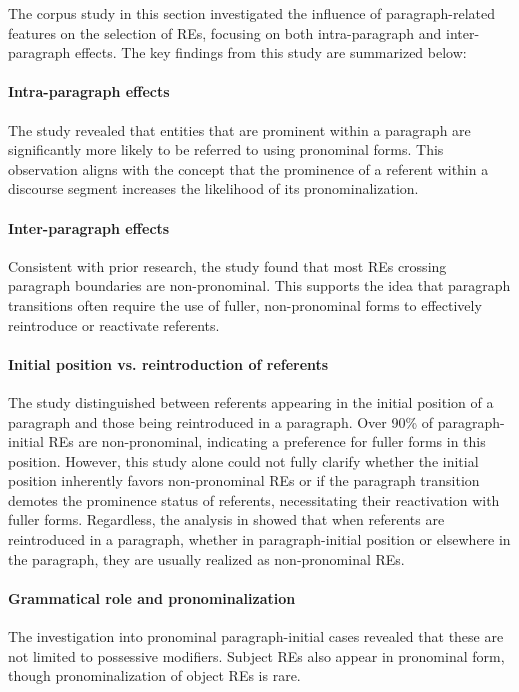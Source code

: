 The corpus study in this section investigated the influence of paragraph-related features on the selection of REs, focusing on both intra-paragraph and inter-paragraph effects. The key findings from this study are summarized below:

\paragraph*{Intra-paragraph effects} The study revealed that entities that are prominent within a paragraph are significantly more likely to be referred to using pronominal forms. This observation aligns with the concept that the prominence of a referent within a discourse segment increases the likelihood of its pronominalization.

\paragraph*{Inter-paragraph effects} Consistent with prior research, the study found that most REs crossing paragraph boundaries are non-pronominal. This supports the idea that paragraph transitions often require the use of fuller, non-pronominal forms to effectively reintroduce or reactivate referents.

\paragraph*{Initial position vs. reintroduction of referents} The study distinguished between referents appearing in the initial position of a paragraph and those being reintroduced in a paragraph. Over 90\% of paragraph-initial REs are non-pronominal, indicating a preference for fuller forms in this position. However, this study alone could not fully clarify whether the initial position inherently favors non-pronominal REs or if the paragraph transition demotes the prominence status of referents, necessitating their reactivation with fuller forms.  Regardless, the analysis in  showed that when referents are reintroduced in a paragraph, whether in paragraph-initial position or elsewhere in the paragraph, they are usually realized as non-pronominal REs.

\paragraph*{Grammatical role and pronominalization} The investigation into pronominal paragraph-initial cases revealed that these are not limited to possessive modifiers. Subject REs also appear in pronominal form, though pronominalization of object REs is rare.

